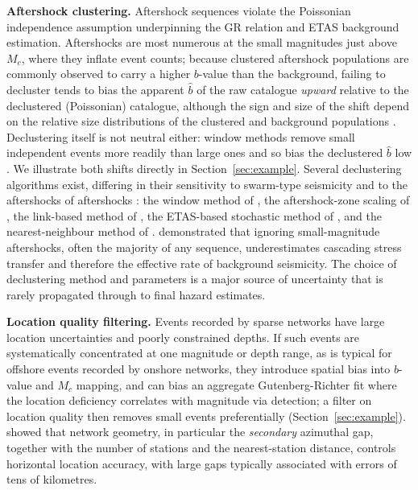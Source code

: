 \documentclass[12pt]{article}
\begin{document}
\textbf{Aftershock clustering.}  Aftershock sequences violate the Poissonian
independence assumption underpinning the GR relation and ETAS background
estimation.  Aftershocks are most numerous at the small magnitudes just above
$M_c$, where they inflate event counts; because clustered aftershock
populations are commonly observed to carry a higher $b$-value than the background, failing to
decluster tends to bias the apparent $\hat{b}$ of the raw catalogue \emph{upward}
relative to the declustered (Poissonian) catalogue, although the sign and size
of the shift depend on the relative size distributions of the clustered and
background populations \citep{marsan2008}.  Declustering itself is not neutral
either: window methods remove small independent events more readily than large
ones and so bias the declustered $\hat{b}$ low \citep{mizrahi2021}.  We
illustrate both shifts directly in Section~\ref{sec:example}.  Several declustering algorithms
exist, differing in their sensitivity to swarm-type seismicity and to the
aftershocks of aftershocks \citep{vanstiphout2012}: the window method of
\citet{gardner1974}, the aftershock-zone scaling of \citet{kagan2002}, the
link-based method of \citet{reasenberg1985}, the ETAS-based stochastic method of
\citet{zhuang2002}, and the nearest-neighbour method of \citet{zaliapin2013}.
\citet{helmstetter2005} demonstrated that ignoring small-magnitude
aftershocks, often the majority of any sequence, underestimates cascading
stress transfer and therefore the effective rate of background seismicity.
The choice of declustering method and parameters is a major source of
uncertainty that is rarely propagated through to final hazard estimates.

\textbf{Location quality filtering.}  Events recorded by sparse networks have
large location uncertainties and poorly constrained depths.  If such events
are systematically concentrated at one magnitude or depth range, as is
typical for offshore events recorded by onshore networks, they introduce
spatial bias into $b$-value and $M_c$ mapping, and can bias an aggregate
Gutenberg-Richter fit where the location deficiency correlates with magnitude
via detection; a filter on location quality then removes small events
preferentially (Section~\ref{sec:example}).
\citet{bondar2004} showed that network geometry, in particular the
\emph{secondary} azimuthal gap, together with the number of stations and the
nearest-station distance, controls horizontal location accuracy, with large
gaps typically associated with errors of tens of kilometres.
\end{document}
